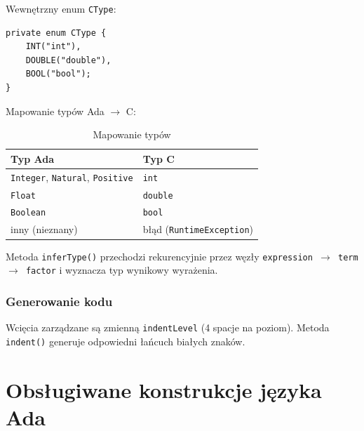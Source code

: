 \documentclass[12pt,a4paper]{article}
\begin{document}
Wewnętrzny enum \texttt{CType}:

\begin{lstlisting}[style=c, caption={Enum CType}]
private enum CType {
    INT("int"),
    DOUBLE("double"),
    BOOL("bool");
}
\end{lstlisting}

Mapowanie typów Ada $\rightarrow$ C:

\begin{table}[h!]
\centering
\begin{tabular}{ll}
\toprule
\textbf{Typ Ada}                  & \textbf{Typ C} \\
\midrule
\texttt{Integer}, \texttt{Natural}, \texttt{Positive} & \texttt{int}    \\
\texttt{Float}                    & \texttt{double} \\
\texttt{Boolean}                  & \texttt{bool}   \\
inny (nieznany)                   & błąd (\texttt{RuntimeException}) \\
\bottomrule
\end{tabular}
\caption{Mapowanie typów}
\end{table}

Metoda \texttt{inferType()} przechodzi rekurencyjnie przez węzły
\texttt{expression $\rightarrow$ term $\rightarrow$ factor} i wyznacza typ
wynikowy wyrażenia.

\subsubsection{Generowanie kodu}

Wcięcia zarządzane są zmienną \texttt{indentLevel} (4 spacje na poziom).
Metoda \texttt{indent()} generuje odpowiedni łańcuch białych znaków.

\section{Obsługiwane konstrukcje języka Ada}
\end{document}
